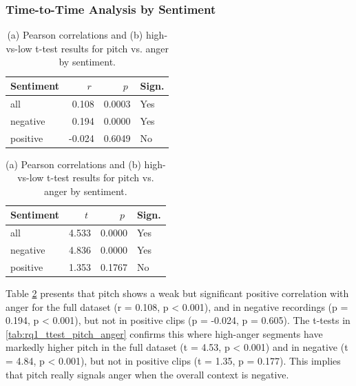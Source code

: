   \subsubsection{Time-to-Time Analysis by Sentiment}
  \begin{table}[H]
    \centering
    \begin{subtable}{0.45\textwidth}
      \centering
      \caption{Pitch and Anger (Pearson \(r\))}\label{tab:rq1_corr_pitch_anger}
      \begin{tabular}{l r r l}
        \toprule
        Sentiment & \(\;r\;\) & \(\;p\;\) & Sign. \\
        \midrule
        all      &  0.108 & 0.0003 & Yes \\
        negative &  0.194 & 0.0000 & Yes \\
        positive & -0.024 & 0.6049 & No  \\
        \bottomrule
      \end{tabular}
    \end{subtable}\hfill
    \begin{subtable}{0.45\textwidth}
      \centering
      \caption{Pitch and Anger (t-test)}\label{tab:rq1_ttest_pitch_anger}
      \begin{tabular}{l r r l}
        \toprule
        Sentiment & \(\;t\;\) & \(\;p\;\) & Sign. \\
        \midrule
        all      &  4.533 & 0.0000 & Yes \\
        negative &  4.836 & 0.0000 & Yes \\
        positive &  1.353 & 0.1767 & No  \\
        \bottomrule
      \end{tabular}
    \end{subtable}
    \caption{(a) Pearson correlations and (b) high-vs-low t-test results for pitch vs. anger by sentiment.}
    \label{tab:rq1_pitch_anger_side_by_side}
  \end{table}
  
  Table \ref{tab:rq1_pitch_anger_side_by_side} presents that pitch shows a weak but significant positive correlation with anger for the full dataset (r = 0.108, p < 0.001), and in negative recordings (p = 0.194, p < 0.001), but not in positive clips (p = -0.024, p = 0.605). 
  The t-tests in \ref{tab:rq1_ttest_pitch_anger} confirms this where high-anger segments have markedly higher pitch in the full dataset (t = 4.53, p < 0.001) and in negative (t = 4.84, p < 0.001), but not in positive clips (t = 1.35, p = 0.177).
  This implies that pitch really signals anger when the overall context is negative. 

